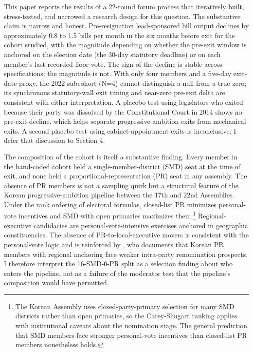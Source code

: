 \documentclass[11pt]{article}
\begin{document}
This paper reports the results of a 22-round forum process that iteratively built, stress-tested, and narrowed a research design for this question. The substantive claim is narrow and honest. Pre-resignation lead-sponsored bill output declines by approximately 0.8 to 1.5 bills per month in the six months before exit for the cohort studied, with the magnitude depending on whether the pre-exit window is anchored on the election date (the 30-day statutory deadline) or on each member's last recorded floor vote. The sign of the decline is stable across specifications; the magnitude is not. With only four members and a five-day exit-date proxy, the 2022 subcohort (N=4) cannot distinguish a null from a true zero; its synchronous statutory-wall exit timing and near-zero pre-exit delta are consistent with either interpretation. A placebo test using legislators who exited because their party was dissolved by the Constitutional Court in 2014 shows no pre-exit decline, which helps separate progressive-ambition exits from mechanical exits. A second placebo test using cabinet-appointment exits is inconclusive; I defer that discussion to Section 4.

The composition of the cohort is itself a substantive finding. Every member in the hand-coded cohort held a single-member-district (SMD) seat at the time of exit, and none held a proportional-representation (PR) seat in any assembly. The absence of PR members is not a sampling quirk but a structural feature of the Korean progressive-ambition pipeline between the 17th and 22nd Assemblies. Under the \citet{careyshugart1995} rank ordering of electoral formulas, closed-list PR minimizes personal-vote incentives and SMD with open primaries maximizes them.\footnote{The Korean Assembly uses closed-party-primary selection for many SMD districts rather than open primaries, so the Carey-Shugart ranking applies with institutional caveats about the nomination stage. The general prediction that SMD members face stronger personal-vote incentives than closed-list PR members nonetheless holds.} Regional-executive candidacies are personal-vote-intensive exercises anchored in geographic constituencies. The absence of PR-to-local-executive movers is consistent with the personal-vote logic and is reinforced by \citet{im2025}, who documents that Korean PR members with regional anchoring face weaker intra-party renomination prospects. I therefore interpret the 16-SMD-0-PR split as a selection finding about who enters the pipeline, not as a failure of the moderator test that the pipeline's composition would have permitted.
\end{document}
